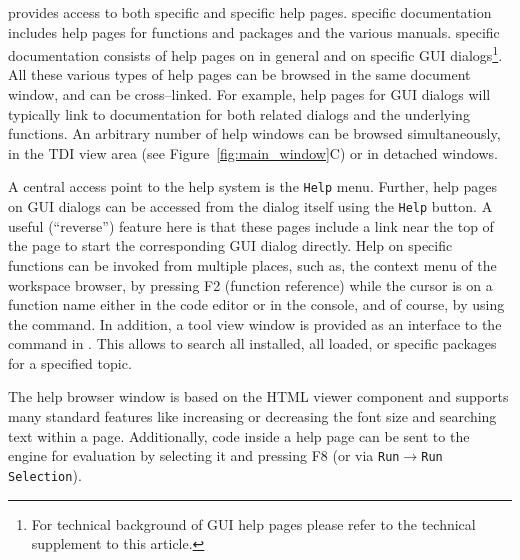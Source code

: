  provides access to both  specific and 
 specific help pages.
 specific documentation includes help pages for functions and packages 
and the various  manuals.  specific documentation consists of
help pages on  in general and on specific GUI dialogs\footnote{For technical 
background of  GUI help pages please refer to the technical supplement to this article.}. 
All these various types of help pages can be browsed in the same document 
window, and can be cross--linked. For example, help pages for
 GUI dialogs will typically link to documentation for both
related  dialogs and the underlying  functions.
An arbitrary number of help windows can be browsed simultaneously, in the
TDI view area (see Figure~\ref{fig:main_window}C) or in detached windows.

A central access point to the help system is the \texttt{Help} menu. Further, help pages on
 GUI dialogs can be accessed from the dialog itself using the
\texttt{Help} button. A useful (``reverse'') feature here is that these pages include 
a link near the top of the page to start the corresponding GUI dialog directly.
Help on  specific functions can be invoked from multiple places, 
such as, the context menu of the workspace browser, by pressing F2 (function
reference) while the cursor is on a function name either in the code editor or 
in the  console, and of course, by using the  
command. In addition, a tool view window is provided as an interface to the
 command in . This allows to search all installed, 
all loaded, or specific  packages for a specified topic.

The help browser window is based on the 
HTML viewer component and supports many standard
features like increasing or decreasing the font size and searching text
within a page. Additionally,  code inside a help
page can be sent to the  engine for
evaluation by selecting it and pressing F8 (or via \texttt{Run$\rightarrow$Run
Selection}).
